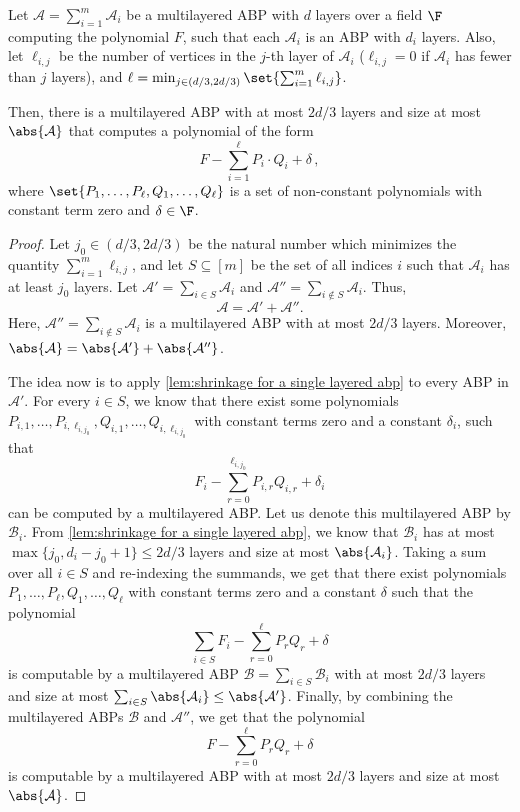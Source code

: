 \begin{lemma}\label{lem:shrinkage general}
	Let $\mathcal{A} = \sum_{i=1}^{m} \mathcal{A}_i$ be a multilayered ABP with $d$ layers over a field $\F$ computing the polynomial $F$, such that each $\mathcal{A}_i$ is an ABP with $d_i$ layers.
	Also, let $\ell_{i,j}$ be the number of vertices in the $j$-th layer of $\mathcal{A}_i$ ($\ell_{i,j} = 0$ if $\mathcal{A}_i$ has fewer than $j$ layers), and $\ell = \min_{j \in (d/3, 2d/3)} \set{\sum_{i=1}^m \ell_{i,j}}$.
	
	Then, there is a multilayered ABP  with at most $2d/3$ layers and size at most $\abs{\mathcal{A}}$ that computes a polynomial of the form
	\[F - \sum_{i=1}^{\ell} P_i \cdot Q_i + \delta \, , \]
	where $\set{P_1, \ldots, P_{\ell}, Q_1, \ldots, Q_{\ell}}$ is a set of non-constant polynomials with constant term zero and $\delta \in \F$.
\end{lemma}
	
\begin{proof}
	Let $j_0 \in (d/3, 2d/3)$ be the natural number which minimizes the quantity $\sum_{i=1}^m \ell_{i,j}$, and let $S \subseteq [m]$ be the set of all indices $i$ such that $\mathcal{A}_i$ has at least $j_0$ layers. Let $\mathcal{A}' = \sum_{i \in S}\mathcal{A}_i$ and $\mathcal{A}'' = \sum_{i \notin S}\mathcal{A}_i$. Thus, 
	\[
		\mathcal{A} = \mathcal{A}' + \mathcal{A}''.
	\]		
	Here, $\mathcal{A}'' = \sum_{i \notin S}\mathcal{A}_i$ is a multilayered ABP with at most $2d/3$ layers. Moreover, $\abs{\mathcal{A}} = \abs{\mathcal{A}'} + \abs{\mathcal{A}''}$.
		
	The idea now is to apply \autoref{lem:shrinkage for a single layered abp} to every ABP in $\mathcal{A}'$. For every $i \in S$, we know that there exist some polynomials $P_{i,1}, \ldots, P_{i, \ell_{i, {j_0}}}, Q_{i,1}, \ldots, Q_{i, \ell_{i, {j_0}}}$ with constant terms zero and a constant $\delta_i$, such that  
	\[
		F_i - \sum_{r = 0}^{\ell_{i, {j_0}}} P_{i, r}Q_{i,r} + \delta_i
	\]
	can be computed by a multilayered ABP. Let us denote this multilayered ABP by $\mathcal{B}_i$. From \autoref{lem:shrinkage for a single layered abp}, we know that $\mathcal{B}_i$ has at most $\max\{j_0, d_i-j_0+1\} \leq 2d/3$ layers and size at most $\abs{\mathcal{A}_i}$. Taking a sum over all $i \in S$ and re-indexing the summands, we get that there exist polynomials $P_{1}, \ldots, P_{\ell}, Q_{1}, \ldots, Q_{\ell}$ with constant terms zero and a constant $\delta$ such that the polynomial 
	\[
		\sum_{i\in S} F_i - \sum_{r = 0}^{\ell} P_{r}Q_{r} + \delta
	\]
	is computable by a multilayered ABP $\mathcal{B} = \sum_{i \in S} \mathcal{B}_i$ with at most $2d/3$ layers and size at most $\sum_{i \in S} \abs{\mathcal{A}_i} \leq \abs{\mathcal{A}'}$. Finally, by combining the multilayered ABPs $\mathcal{B}$ and $\mathcal{A}''$, we get that the polynomial 
	\[
		F  - \sum_{r = 0}^{\ell} P_{r}Q_{r} + \delta
	\]
	is computable by a multilayered ABP with at most $2d/3$ layers and size at most $\abs{\mathcal{A}}$.
\end{proof}
	
